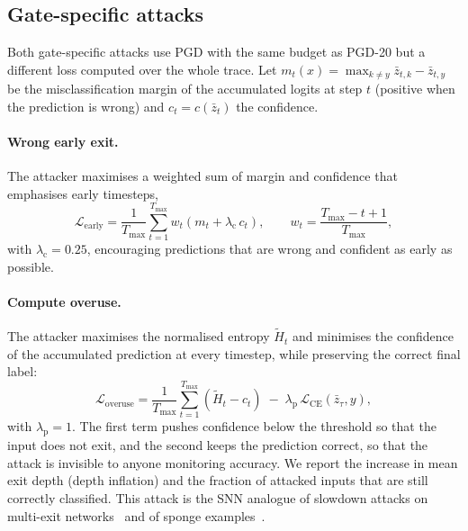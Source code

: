 \subsection{Gate-specific attacks}

Both gate-specific attacks use PGD with the same budget as PGD-20 but a different loss computed over the whole trace. Let $m_t(x) = \max_{k \neq y} \bar{z}_{t,k} - \bar{z}_{t,y}$ be the misclassification margin of the accumulated logits at step $t$ (positive when the prediction is wrong) and $c_t = c(\bar{z}_t)$ the confidence.

\paragraph{Wrong early exit.} The attacker maximises a weighted sum of margin and confidence that emphasises early timesteps,
\begin{equation}
    \mathcal{L}_{\mathrm{early}} = \frac{1}{T_{\max}} \sum_{t=1}^{T_{\max}} w_t \left( m_t + \lambda_{\mathrm{c}} \, c_t \right), \qquad w_t = \frac{T_{\max} - t + 1}{T_{\max}},
    \label{eq:wrong-exit}
\end{equation}
with $\lambda_{\mathrm{c}} = 0.25$, encouraging predictions that are wrong and confident as early as possible.

\paragraph{Compute overuse.} The attacker maximises the normalised entropy $\tilde{H}_t$ and minimises the confidence of the accumulated prediction at every timestep, while preserving the correct final label:
\begin{equation}
    \mathcal{L}_{\mathrm{overuse}} = \frac{1}{T_{\max}} \sum_{t=1}^{T_{\max}} \left(\tilde{H}_t - c_t\right) \; - \; \lambda_{\mathrm{p}} \, \mathcal{L}_{\mathrm{CE}}\left(\bar{z}_{\tau}, y\right),
    \label{eq:overuse}
\end{equation}
with $\lambda_{\mathrm{p}} = 1$. The first term pushes confidence below the threshold so that the input does not exit, and the second keeps the prediction correct, so that the attack is invisible to anyone monitoring accuracy. We report the increase in mean exit depth (depth inflation) and the fraction of attacked inputs that are still correctly classified. This attack is the SNN analogue of slowdown attacks on multi-exit networks~\cite{hong2021panda} and of sponge examples~\cite{shumailov2021sponge}.

